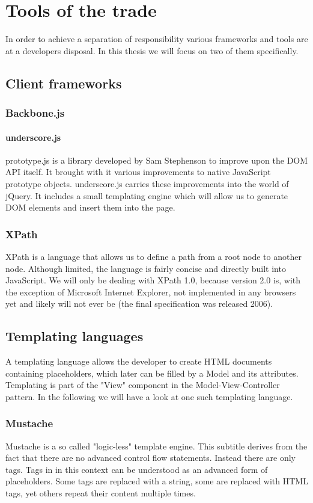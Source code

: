 \documentclass[thesis.tex]{subfiles}
\begin{document}
\chapter{Tools of the trade}
\label{chap:tools}
In order to achieve a separation of responsibility various frameworks and tools
are at a developers disposal. In this thesis we will focus on two of them
specifically.
\section{Client frameworks}
\subsection{Backbone.js}
\subsubsection{underscore.js}
prototype.js is a library developed by Sam Stephenson to improve upon the
DOM API itself.
It brought with it various improvements to native JavaScript prototype objects.
underscore.js carries these improvements into the world of jQuery.
It includes a small templating engine which will allow us to generate
DOM elements and insert them into the page.
\subsection{XPath}
XPath is a language that allows us to define a path from a root node to another
node. Although limited, the language is fairly concise and directly built into
JavaScript. We will only be dealing with XPath 1.0, because version 2.0 is, with
the exception of Microsoft Internet Explorer, not implemented in any browsers
yet and likely will not ever be (the final specification was released 2006).
\section{Templating languages}
A templating language allows the developer to create HTML documents containing
placeholders, which later can be filled by a Model and its attributes.
Templating is part of the "View" component in the Model-View-Controller
pattern. In the following we will have a look at one such templating language.

\subsection{Mustache}
Mustache is a so called "logic-less" template engine.
This subtitle derives from the fact that there are no advanced control flow
statements. Instead there are only tags.
Tags in in this context can be understood as an advanced form of placeholders.
Some tags are replaced with a string, some are replaced with HTML tags,
yet others repeat their content multiple times.
\end{document}
